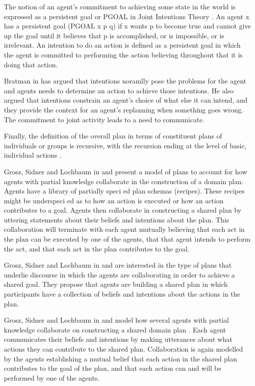 \documentclass[11pt]{article}
\begin{document}
The notion of an agent’s commitment to achieving some state in the world is
expressed as a persistent goal or PGOAL in Joint Intentions Theory
\cite{cohen:intention-commitment}. An agent x has a persistent goal (PGOAL x p
q) if x wants p to become true and cannot give up the goal until it believes
that p is accomplished, or is impossible, or is irrelevant. An intention to do
an action is defined as a persistent goal in which the agent is committed to
performing the action believing throughout that it is doing that action.

Bratman in \cite{bratman:intentions-plans} has argued that intentions noramlly
pose the problems for the agent and agents needs to determine an action to
achieve those intentions. He also argued that intentions constrain an agent’s
choice of what else it can intend, and they provide the context for an agent’s
replanning when something goes wrong. The commitment to joint activity leads to
a need to communicate.

Finally, the definition of the overall plan in terms of constituent plans of
individuals or groups is recursive, with the recursion ending at the level of
basic, individual actions \cite{grosz:mice-menus}.

Grosz, Sidner and Lochbaum in \cite{grosz:plans-discourse} and
\cite{lochbaum:plan-models} present a model of plans to account for how agents
with partial knowledge collaborate in the construction of a domain plan. Agents
have a library of partially speci ed plan schemas (recipes). These recipes might
be underspeci ed as to how an action is executed or how an action contributes to
a goal. Agents then collaborate in constructing a shared plan by uttering
statements about their beliefs and intentions about the plan. This collaboration
will terminate with each agent mutually believing that each act in the plan can
be executed by one of the agents, that that agent intends to perform the act,
and that each act in the plan contributes to the goal.

Grosz, Sidner and Lochbaum in \cite{grosz:plans-discourse} and
\cite{lochbaum:plan-models} are interested in the type of plans that underlie
discourse in which the agents are collaborating in order to achieve a shared
goal. They propose that agents are building a shared plan in which participants
have a collection of beliefs and intentions about the actions in the plan.

Grosz, Sidner and Lochbaum in \cite{grosz:plans-discourse} and
\cite{lochbaum:plan-models} model how several agents with partial knowledge
collaborate on constructing a shared domain plan . Each agent communicates their
beliefs and intentions by making utterances about what actions they can
contribute to the shared plan. Collaboration is again modelled by the agents
establishing a mutual belief that each action in the shared plan contributes to
the goal of the plan, and that each action can and will be performed by one of
the agents.
\end{document}
